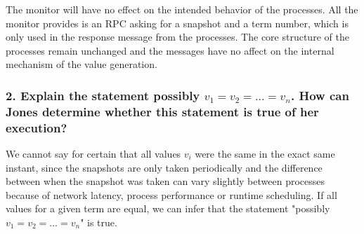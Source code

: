 \documentclass[a4paper,11pt]{article}
\begin{document}
The monitor will have no effect on the intended behavior of the processes. All the monitor provides is an RPC asking for a snapshot and a term number, which is only used in the response message from the processes. The core structure of the processes remain unchanged and the messages have no affect on the internal mechanism of the value generation.


\subsubsection*{2. Explain the statement possibly $v_1 = v_2 = ... = v_n$. How can Jones determine whether this statement is true of her execution?}
We cannot say for certain that all values $v_i$ were the same in the exact same instant, since the snapshots are only taken periodically and the difference between when the snapshot was taken can vary slightly between processes because of network latency, process performance or runtime scheduling. If all values for a given term are equal, we can infer that the statement "possibly $v_1 = v_2 = ... = v_n$" is true.
\end{document}
